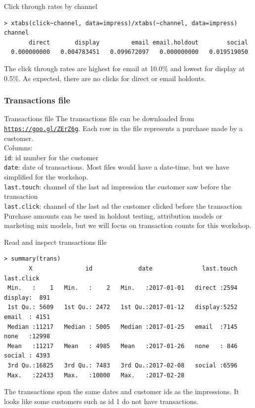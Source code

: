 \documentclass[10pt, aspectratio=169]{beamer}
\begin{document}
\begin{frame}[fragile]{Click through rates by channel}
\begin{lstlisting}
> xtabs(click~channel, data=impress)/xtabs(~channel, data=impress)
channel
       direct       display         email email.holdout        social 
  0.000000000   0.004783451   0.099672097   0.000000000   0.019519050 
\end{lstlisting}
\alert{The click through rates are highest for email at 10.0\% and lowest for display at 0.5\%.  As expected, there are no clicks for direct or email holdouts.}
\end{frame}

\subsubsection{Transactions file}

\begin{frame}[fragile]{\alert{Transactions file}}
The transactions file can be downloaded from \href{https://goo.gl/ZErZ6g}{\texttt{https://goo.gl/ZErZ6g}}. Each row in the file represents a purchase made by a customer. \\
\bigskip
Columns: \\
\verb|id|: id number for the customer \\
\verb|date|: date of transactions. Most files would have a date-time, but we have simplified for the workshop.  \\
\verb|last.touch|: channel of the last ad impression the customer saw before the transaction\\
\verb|last.click|: channel of the last ad the customer clicked before the transaction\\
\bigskip
Purchase amounts can be used in holdout testing, attribution models or marketing mix models, but we will focus on transaction counts for this workshop.\\
\end{frame}

\begin{frame}[fragile]{Read and inspect \alert{transactions file}}
\begin{lstlisting}
> summary(trans)
       X               id             date              last.touch     last.click   
 Min.   :    1   Min.   :    2   Min.   :2017-01-01   direct :2594   display:  891  
 1st Qu.: 5609   1st Qu.: 2472   1st Qu.:2017-01-12   display:5252   email  : 4151  
 Median :11217   Median : 5005   Median :2017-01-25   email  :7145   none   :12998  
 Mean   :11217   Mean   : 4985   Mean   :2017-01-26   none   : 846   social : 4393  
 3rd Qu.:16825   3rd Qu.: 7483   3rd Qu.:2017-02-08   social :6596                  
 Max.   :22433   Max.   :10000   Max.   :2017-02-28  
\end{lstlisting}
\alert{The transactions span the same dates and customer ids as the impressions.  It looks like some customers such as id 1 do not have transactions.}
\end{frame}
\end{document}
